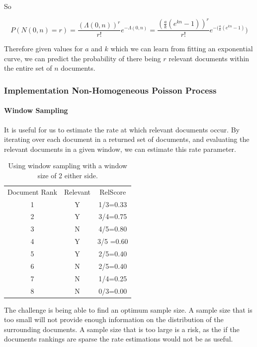 So

\begin{equation}
	   P(N(0,n) = r) = \frac{(\Lambda(0,n))^r}{r!}e^{-\Lambda(0,n)} = \frac{\left(\frac{a}{k}(e^{kn} -1)\right)^r}{r!} e^{-(\frac{a}{k}(e^{kn} - 1)})
\end{equation}

Therefore given values for $a$ and $k$ which we can learn from fitting an exponential curve, we can predict the probability of there being $r$ relevant documents within the entire set of $n$ documents.


\subsubsection{Implementation Non-Homogeneous Poisson Process} \label{imp_non_hom}

\paragraph{Window Sampling} \label{window_samp}

It is useful for us to estimate the rate at which relevant documents occur. By iterating over each document in a returned set of documents, and evaluating the relevant documents in a given window, we can estimate this rate parameter. 

\begin{table}[H]

\centering
\begin{tabular}{|c|c|c|} 
\hline
 Document Rank & Relevant & RelScore  \\ 
 1 & Y &			1/3=0.33 \\ 
 2 & Y &			3/4=0.75 \\ 
 3 & N &			4/5=0.80 \\ 
 4 & Y &			3/5 =0.60 \\ 
 5 & Y &			2/5=0.40 \\ 
 6 & N &			2/5=0.40 \\ 
 7 & N &			1/4=0.25 \\
 8 & N &			0/3=0.00 \\
  
 \hline
\end{tabular}

\caption{Using window sampling with a window size of 2 either side.}

\end{table}

The challenge is being able to find an optimum sample size. A sample size that is too small will not provide enough information on the distribution of the surrounding documents. A sample size that is too large is a risk, as the if the documents rankings are sparse the rate estimations would not be as useful.

